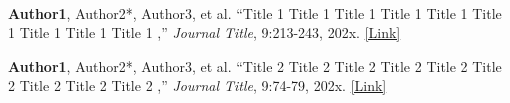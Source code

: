 
\begin{cventries}
	
	\cventry
	{} %
	{\ } %
	{\ } %
	{} %
{   	\vspace{-8mm}
	\begin{cvitemize2}
		\item \textbf{Author1},  Author2*, Author3, et al. ``Title 1 Title 1 Title 1 Title 1 Title 1 Title 1 Title 1 Title 1 Title 1 ,'' \textit{Journal Title}, 9:213-243, 202x.  \href{https://ieeexplore.ieee.org/12345}{\textcolor{link}{ [Link]}} 
		\vspace{1mm}	
		\item \textbf{Author1},  Author2*, Author3, et al. ``Title 2 Title 2 Title 2 Title 2 Title 2 Title 2 Title 2 Title 2 Title 2 ,'' \textit{Journal Title}, 9:74-79, 202x.  \href{https://ieeexplore.ieee.org/document/54321}{\textcolor{link}{[Link]}}
	\end{cvitemize2}
	\vspace{-4mm}
}
	
	
\end{cventries}

